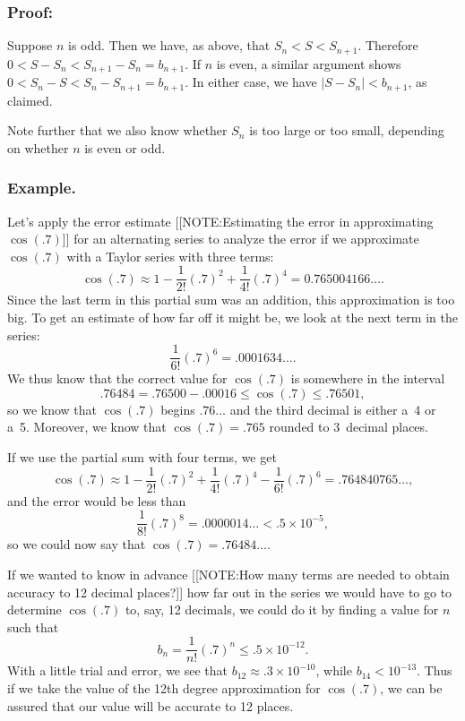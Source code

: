 \subsubsection{Proof:}
Suppose $n$ is odd.  Then we have, as above, that
$S_n<S<S_{n+1}$.  Therefore $0<S-S_n<S_{n+1}-S_n=b_{n+1}$.  If $n$ is
even, a similar argument shows $0<S_n-S<S_n-S_{n+1}=b_{n+1}$.  In
either case, we have $|S-S_n| < b_{n+1}$, as claimed.

Note further that we also know whether $S_n$ is too large or too
small, depending on whether $n$ is even or odd.




\subsubsection{Example.}
Let's apply the error estimate 
[[NOTE:Estimating the error in approximating $\cos(.7)$]]
for an alternating series to analyze the error if we approximate
$\cos(.7)$ with a Taylor series with three terms:
\[
\cos(.7) \approx        1 - \dfrac{1}{2!} (.7)^2 
                + \dfrac{1}{4!} (.7)^4
                = 0.765004166\ldots .
\]
Since the last term in this partial sum was an addition, this
approximation is too big.  To get an estimate of how far off it might
be, we look at the next term in the series:
\[
\dfrac{1}{6!} (.7)^6 = .0001634\ldots .
\]
We thus know that the correct value for $\cos(.7)$ is somewhere in the
interval
\[
.76484 = .76500 - .00016 \leq \cos(.7) \leq .76501,
\]
so we know that $\cos(.7)$ begins $.76\ldots$ and the third decimal is
either a~4 or a~5.  Moreover, we know that $\cos(.7) = .765$ rounded
to 3~decimal places.

If we use the partial sum with four terms, we get
\[
\cos(.7) \approx        1 - \dfrac{1}{2!} (.7)^2 
                + \dfrac{1}{4!} (.7)^4
                - \dfrac{1}{6!} (.7)^6 
                = .764840765\ldots ,
\]
and the error would be less than
\[
\dfrac{1}{8!}(.7)^8 = .0000014\ldots < .5 \times 10^{-5},
\]
so we could now say that $\cos(.7) =.76484\ldots .$

If we wanted to know in advance 
[[NOTE:How many terms  are needed  to obtain accuracy  to 12 decimal places?]]
how far out in the series we would have to go to determine $\cos(.7)$
to, say, 12 decimals, we could do it by finding a value for $n$ such
that
\[
b_n = \dfrac{1}{n!}(.7)^n \leq .5 \times 10^{-12}.
\]
With a little trial and error, we see that $b_{12} \approx .3 \times
10^{-10}$, while \mbox{$b_{14} < 10^{-13}$}.  Thus if we take the
value of the 12th degree approximation for $\cos(.7)$, we can be
assured that our value will be accurate to 12 places.

